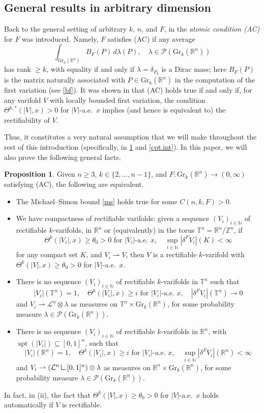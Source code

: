 \documentclass[11pt,a4paper]{amsart}
\newcommand{\N}{\mathbb{N}}
\newcommand{\Z}{\mathbb{Z}}
\newcommand{\R}{\mathbb{R}}
\newcommand{\mrestr}{\mathbin{\vrule height 1.6ex depth 0pt width
0.13ex\vrule height 0.13ex depth 0pt width 1.3ex}}
\theoremstyle{definition}
\newtheorem{proposition}[definition]{Proposition}
\newcommand{\weakto}{\rightharpoonup}
\newcommand{\gr}{\text{Gr}_k(\R^n)}
\begin{document}
\subsection{General results in arbitrary dimension}
Back to the general setting of arbitrary $k$, $n$, and $F$, in \cite{DDG} the \emph{atomic condition (AC)} for $F$ was introduced. Namely, $F$ satisfies (AC) if any average
$$\int_{\gr}B_F(P)\,d\lambda(P),\quad\lambda\in\mathcal{P}(\gr)$$
has rank $\ge k$, with equality if and only if $\lambda=\delta_{P_0}$ is a Dirac mass;
here $B_F(P)$ is the matrix naturally associated with $P\in\gr$ in the computation of the first variation
(see \cref{bf}).
It was shown in \cite{DDG} that (AC) holds true
if and only if, for any varifold $V$ with locally bounded first variation,
the condition $\Theta^{k,*}(|V|,x)>0$ for $|V|$-a.e.\ $x$ implies (and hence is equivalent to) the rectifiability of $V$.

Thus, it constitutes a very natural assumption that we will make throughout the rest of this introduction
(specifically, in \cref{equiv} and \cref{cpt.int}).
In this paper, we will also prove the following general facts.


\begin{proposition}\label{equiv}
    Given $n\ge3$, $k\in\{2,\dots,n-1\}$, and $F:\gr\to(0,\infty)$ satisfying (AC), the following are equivalent.
    \begin{itemize}
        \item[(i)] The Michael--Simon bound \cref{ms} holds true for some $C(n,k,F)>0$.
        \item[(ii)] We have compactness of rectifiable varifolds: given a sequence $(V_i)_{i\in\N}$ of rectifiable $k$-varifolds, in $\R^n$ or (equivalently) in the torus $\mathbb{T}^n=\R^n/\Z^n$, if
        $$\Theta^k(|V_i|,x)\ge\theta_0>0\text{ for $|V_i|$-a.e.\ $x$},\quad\sup_{i\in\N}|\delta^FV_i|(K)<\infty$$
        for any compact set $K$, and $V_i\weakto V$, then $V$ is a rectifiable $k$-varifold
        with $\Theta^k(|V|,x)\ge\theta_0>0$ for $|V|$-a.e.\ $x$.
        \item[(iii)] There is no sequence $(V_i)_{i\in\N}$ of rectifiable $k$-varifolds in
        $\mathbb{T}^n$ such that
        $$|V_i|(\mathbb{T}^n)=1,\quad\Theta^k(|V_i|,x)\ge i\text{ for $|V_i|$-a.e.\ $x$},\quad|\delta^FV_i|(\mathbb{T}^n)\to0$$
        and $V_i\weakto\mathcal{L}^n\otimes\lambda$ as measures on $\mathbb{T}^n\times\gr$,
        for some probability measure $\lambda\in\mathcal{P}(\gr)$.
        \item[(iv)]
         There is no sequence $(V_i)_{i\in\N}$ of rectifiable $k$-varifolds in $\R^n$, with
         $\operatorname{spt}(|V_i|)\subseteq[0,1]^n$, such that
        $$|V_i|(\mathbb{R}^n)=1,\quad\Theta^k(|V_i|,x)\ge i\text{ for $|V_i|$-a.e.\ $x$},\quad\sup_{i\in\N}|\delta^FV_i|(\mathbb{R}^n)<\infty$$
        and $V_i\weakto(\mathcal{L}^n\mrestr[0,1]^n)\otimes\lambda$ as measures on $\mathbb{\R}^n\times\gr$,
        for some probability measure $\lambda\in\mathcal{P}(\gr)$.
    \end{itemize}
    In fact, in (ii), the fact that $\Theta^k(|V|,x)\ge\theta_0>0$ for $|V|$-a.e.\ $x$
    holds automatically if $V$ is rectifiable.
\end{proposition}
\end{document}
